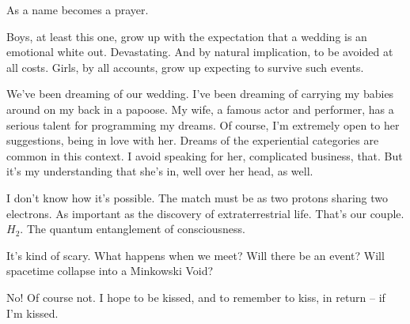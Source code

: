 As a name becomes a prayer.


\vfill
\break


﻿Boys, at least this one, grow up with the expectation that a wedding
is an emotional white out.  Devastating.  And by natural implication,
to be avoided at all costs.  Girls, by all accounts, grow up expecting
to survive such events.


We've been dreaming of our wedding.  I've been dreaming of carrying my
babies around on my back in a papoose.  My wife, a famous actor and
performer, has a serious talent for programming my dreams.  Of course,
I'm extremely open to her suggestions, being in love with her.  Dreams
of the experiential categories are common in this context.  I avoid
speaking for her, complicated business, that.  But it's my
understanding that she's in, well over her head, as well.


\vfill
\break


﻿I don't know how it's possible.  The match must be as two protons
sharing two electrons.  As important as the discovery of
extraterrestrial life.  That's our couple.  $H_{2}$.  The quantum
entanglement of consciousness.


It's kind of scary.  What happens when we meet?  Will there be an
event?  Will spacetime collapse into a Minkowski Void?


No!  Of course not.  I hope to be kissed, and to remember to kiss, in
return -- if I'm kissed.


\vfill
\bye
